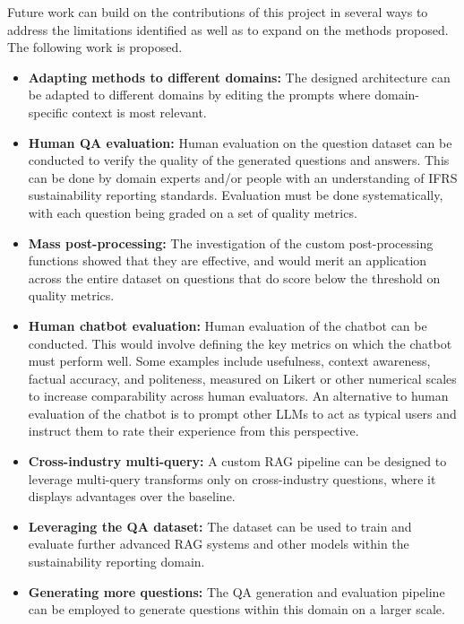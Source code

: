 Future work can build on the contributions of this project in several ways to address the limitations identified as well as to expand on the methods proposed. The following work is proposed.
\begin{itemize}
    \item \textbf{Adapting methods to different domains:} The designed architecture can be adapted to different domains by editing the prompts where domain-specific context is most relevant.
    \item \textbf{Human QA evaluation:} Human evaluation on the question dataset can be conducted to verify the quality of the generated questions and answers. This can be done by domain experts and/or people with an understanding of IFRS sustainability reporting standards. Evaluation must be done systematically, with each question being graded on a set of quality metrics.
    \item \textbf{Mass post-processing:} The investigation of the custom post-processing functions showed that they are effective, and would merit an application across the entire dataset on questions that do score below the threshold on quality metrics.
    \item \textbf{Human chatbot evaluation:} Human evaluation of the chatbot can be conducted. This would involve defining the key metrics on which the chatbot must perform well. Some examples include usefulness, context awareness, factual accuracy, and politeness, measured on Likert or other numerical scales to increase comparability across human evaluators. An alternative to human evaluation of the chatbot is to prompt other LLMs to act as typical users and instruct them to rate their experience from this perspective.
    \item \textbf{Cross-industry multi-query:} A custom RAG pipeline can be designed to leverage multi-query transforms only on cross-industry questions, where it displays advantages over the baseline.
    \item \textbf{Leveraging the QA dataset:} The dataset can be used to train and evaluate further advanced RAG systems and other models within the sustainability reporting domain. 
    \item \textbf{Generating more questions:} The QA generation and evaluation pipeline can be employed to generate questions within this domain on a larger scale.
\end{itemize}
